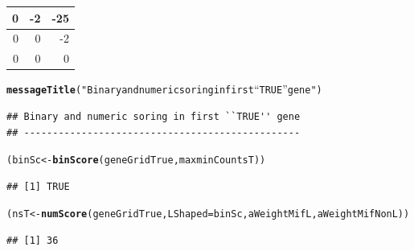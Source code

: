 \documentclass[a4paper,10pt]{article}\usepackage[]{graphicx}\usepackage[]{color}
\makeatletter
\newcommand{\hlstr}[1]{\textcolor[rgb]{0.192,0.494,0.8}{#1}}%
\newcommand{\hlstd}[1]{\textcolor[rgb]{0.345,0.345,0.345}{#1}}%
\newcommand{\hlkwb}[1]{\textcolor[rgb]{0.69,0.353,0.396}{#1}}%
\newcommand{\hlkwc}[1]{\textcolor[rgb]{0.333,0.667,0.333}{#1}}%
\newcommand{\hlkwd}[1]{\textcolor[rgb]{0.737,0.353,0.396}{\textbf{#1}}}%
\newenvironment{kframe}{%
 \def\at@end@of@kframe{}%
 \ifinner\ifhmode%
  \def\at@end@of@kframe{\end{minipage}}%
  \begin{minipage}{\columnwidth}%
 \fi\fi%
 \def\FrameCommand##1{\hskip\@totalleftmargin \hskip-\fboxsep
 \colorbox{shadecolor}{##1}\hskip-\fboxsep
     \hskip-\linewidth \hskip-\@totalleftmargin \hskip\columnwidth}%
 \MakeFramed {\advance\hsize-\width
   \@totalleftmargin\z@ \linewidth\hsize
   \@setminipage}}%
 {\par\unskip\endMakeFramed%
 \at@end@of@kframe}
\newenvironment{knitrout}{}{} %
\makeatother
\begin{document}
\begin{knitrout}
\begin{tabular}{r|r|r}
\hline
0 & -2 & -25\\
\hline
0 & 0 & -2\\
\hline
0 & 0 & 0\\
\hline
\end{tabular}\begin{kframe}\begin{alltt}
\hlkwd{messageTitle}\hlstd{(}\hlstr{"Binary and numeric soring in first ``TRUE'' gene"}\hlstd{)}
\end{alltt}
\begin{verbatim}
## Binary and numeric soring in first ``TRUE'' gene 
## ------------------------------------------------
\end{verbatim}
\begin{alltt}
\hlstd{(binSc}\hlkwb{<-} \hlkwd{binScore} \hlstd{(geneGridTrue, maxminCountsT ))}
\end{alltt}
\begin{verbatim}
## [1] TRUE
\end{verbatim}
\begin{alltt}
\hlstd{(nsT}\hlkwb{<-} \hlkwd{numScore}\hlstd{(geneGridTrue,} \hlkwc{LShaped} \hlstd{= binSc, aWeightMifL, aWeightMifNonL))}
\end{alltt}
\begin{verbatim}
## [1] 36
\end{verbatim}
\end{kframe}
\end{knitrout}
\end{document}
